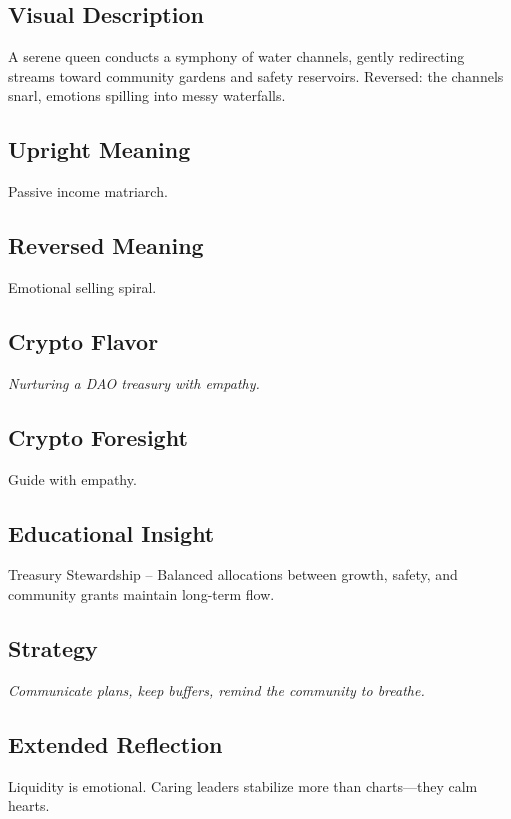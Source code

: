 \documentclass[11pt,oneside]{book}
\begin{document}
\begin{minipage}[t]{0.55\textwidth}
  \vspace{0pt}

  \subsection*{Visual Description}
  A serene queen conducts a symphony of water channels, gently redirecting streams toward community gardens and safety reservoirs. Reversed: the channels snarl, emotions spilling into messy waterfalls.

  \subsection*{Upright Meaning}
  Passive income matriarch.

  \subsection*{Reversed Meaning}
  Emotional selling spiral.

  \subsection*{Crypto Flavor}
  \textit{Nurturing a DAO treasury with empathy.}

  \subsection*{Crypto Foresight}
  Guide with empathy.

  \subsection*{Educational Insight}
  Treasury Stewardship – Balanced allocations between growth, safety, and community grants maintain long-term flow.

  \subsection*{Strategy}
  \textit{Communicate plans, keep buffers, remind the community to breathe.}

  \subsection*{Extended Reflection}
  Liquidity is emotional. Caring leaders stabilize more than charts—they calm hearts.


\end{minipage}
\end{document}
